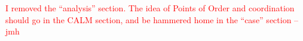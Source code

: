\documentclass{acm_proc_article-sp}
\newcommand{\jmh}[1]{{\textcolor{red}{#1 -- jmh}}}
\newcommand{\wrm}[1]{{\color{BurntOrange}{#1 -- wrm}}}
\begin{document}
\begin{abstract}

\end{abstract}




\jmh{I removed the ``analysis'' section.  The idea of Points of Order and coordination should go in the CALM section, and be hammered home in the ``case'' section}
%








\end{document}
